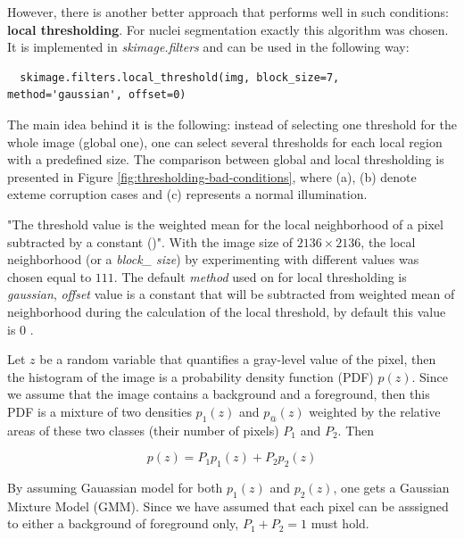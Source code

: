 However, there is another better approach that performs well in such conditions: \textbf{local thresholding}. For nuclei segmentation exactly this algorithm was chosen. It is implemented in \textit{skimage.filters} and can be used in the following way:

\begin{lstlisting}
  skimage.filters.local_threshold(img, block_size=7, method='gaussian', offset=0)
\end{lstlisting}

The main idea behind it is the following: instead of selecting one threshold for the whole image (global one), one can select several thresholds for each local region with a predefined size. The comparison between global and local thresholding is presented in Figure \ref{fig:thresholding-bad-conditions}, where (a), (b) denote exteme corruption cases and (c) represents a normal illumination.

"The threshold value is the weighted mean for the local neighborhood of a pixel subtracted by a constant (\cite{digital_image_book})". With the image size of $2136 \times 2136$, the local neighborhood (or a \textit{block\_ size}) by experimenting with different values was chosen equal to $111$. The default \textit{method} used on for local thresholding is \textit{gaussian}, \textit{offset} value is a constant that will be subtracted from weighted mean of neighborhood during the calculation of the local threshold, by default this value is $0$ \cite{local_thresholding}.

Let $z$ be a random variable that quantifies a gray-level value of the pixel, then the histogram of the image is a probability density function (PDF) $p(z)$. Since we assume that the image contains a background and a foreground, then this PDF is a mixture of two densities $p_1(z)$ and $p_@(z)$ weighted by the relative areas of these two classes (their number of pixels) $P_1$ and $P_2$. Then 

\begin{equation}
    p(z) = P_1 p_1(z) + P_2 p_2(z)
\end{equation}

By assuming Gauassian model for both $p_1(z)$ and $p_2(z)$, one gets a Gaussian Mixture Model (GMM). Since we have assumed that each pixel can be asssigned to either a background of foreground only, $P_1 + P_2 = 1$ must hold. 

